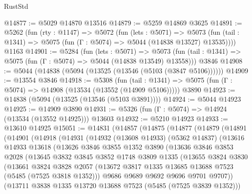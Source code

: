 \begin{lexlean}{RustStd}
\begin{coremodule}
@14877 := @5029 @14870 @13516
@14879 := @5259 @14869 @3625
@14891 := @5262
    (fun (rty : @1147) =>
    @5072
      (fun (lets : @5071) =>
      @5073 (fun (tail : @1341) => @5075 (fun (Γ : @5074) => @5044 (@14838 @13527) @13535))))
    @1163
@14901 := @5284
    (fun (lets : @5071) =>
    @5073 (fun (tail : @1341) => @5075 (fun (Γ : @5074) => @5044 (@14838 @13549) @13558)))
    @3846
@14908 := @5044 (@14838 (@5094 (@13525 (@13546 (@5103 (@3847 @5106))))))
@14909 := @13554 @3846
@14918 := @5308
    (fun (tail : @1341) => @5075 (fun (Γ : @5074) => @14908 (@13534 (@13552 (@14909 @5106)))))
    @3890
@14923 := @14838 (@5094 (@13525 (@13546 (@5103 @3891))))
@14924 := @5044 @14923
@14925 := @14909 @3890
@14931 := @5326 (fun (Γ : @5074) => @14924 (@13534 (@13552 @14925))) @13603
@14932 := @5210 @14923
@14933 := @13610 @14925
@15051 := @14831
    (@14857
      (@14875
        (@14877
          (@14879
            (@14891
              (@14901
                (@14918
                  (@14931
                    (@14932
                      (@13608 @14933)
                      (@5362 @14837)
                      (@13616
                        @14933
                        @13618
                        (@13626
                          @3846
                          @3855
                          @1352
                          @3890
                          (@13636
                            @3846
                            @3853
                            @2028
                            (@13645
                              @3832
                              @3845
                              @3852
                              @1748
                              @3809
                              @1335
                              (@13655
                                @3824
                                @3830
                                (@13661
                                  @3824
                                  @3828
                                  @2057
                                  (@13672
                                    @3817
                                    @1335
                                    @13685
                                    @13688
                                    @7523
                                    (@5485 (@7525 @3818 @1352)))
                                  @9686
                                  @9689
                                  @9692
                                  @9696
                                  @9701
                                  @9707))
                              (@13711 @3838 @1335 @13720 @13688 @7523 (@5485 (@7525 @3839 @1352)))

\end{coremodule}
\end{lexlean}
